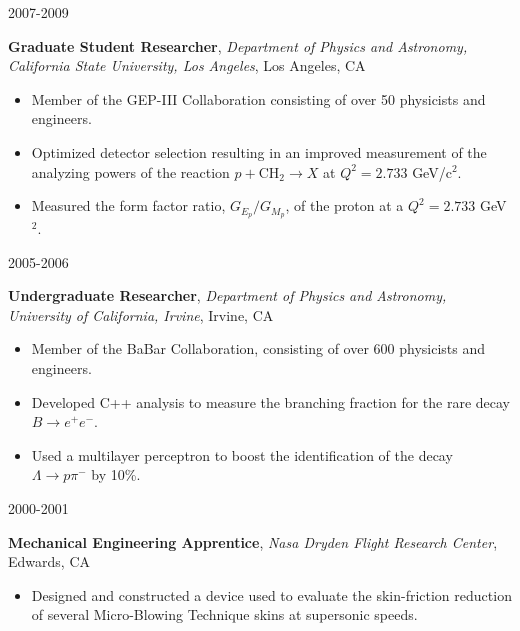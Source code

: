 \documentclass[10pt]{article}
\newcommand{\experienceentry}[5] { 
    \noindent
    \begin{minipage}[t]{0.15\textwidth} \begin{flushright} #1 \end{flushright} \end{minipage} \hspace{0.01\textwidth}
    \begin{minipage}[t]{0.84\textwidth} 
        \textbf{#2}, \emph{#3}, #4 
        #5
    \end{minipage}
}
\begin{document}
        \experienceentry{2007-2009}
                        {Graduate Student Researcher}
                        {Department of Physics and Astronomy, California State University, Los Angeles}
                        {Los Angeles, CA}
                        {
                          \begin{itemize}[label=\textcolor{indigodye}{$\circ$}, noitemsep, nolistsep, leftmargin=*]
                            \item Member of the GEP-III Collaboration consisting of over 50 physicists and engineers.
                            \item Optimized detector selection resulting in an improved measurement of the analyzing
                                powers of the reaction $p + \mbox{CH}_2 \rightarrow X$ at $Q^2 = 2.733$ GeV/c$^{2}$.
                            \item Measured the form factor ratio, $G_{E_p}/G_{M_p}$, of the proton at 
                                  a $Q^{2} = 2.733$ GeV$^{2}$.
                          \end{itemize}
                        } 
        \experienceentry{2005-2006}
                        {Undergraduate Researcher}
                        {Department of Physics and Astronomy, University of California, Irvine}
                        {Irvine, CA}
                        { 
                          \begin{itemize}[label=\textcolor{indigodye}{$\circ$}, noitemsep, nolistsep, leftmargin=*]
                            \item Member of the BaBar Collaboration, consisting of over 600 physicists and engineers.
                            \item Developed C++ analysis to measure the branching fraction for the rare decay 
                                  $B\rightarrow e^+e^-$.
                            \item Used a multilayer perceptron to boost the identification of the decay 
                                  $\Lambda \rightarrow p \pi^-$ by 10\%.  
                          \end{itemize}
                       }
        \experienceentry{2000-2001}
                        {Mechanical Engineering Apprentice}
                        {Nasa Dryden Flight Research Center}
                        {Edwards, CA}
                        {
                          \begin{itemize}[label=\textcolor{indigodye}{$\circ$}, noitemsep, nolistsep, leftmargin=*]
                            \item Designed and constructed a device used to evaluate the skin-friction reduction 
                                  of several Micro-Blowing Technique skins at supersonic speeds. 
                          \end{itemize}
                       }
\end{document}
